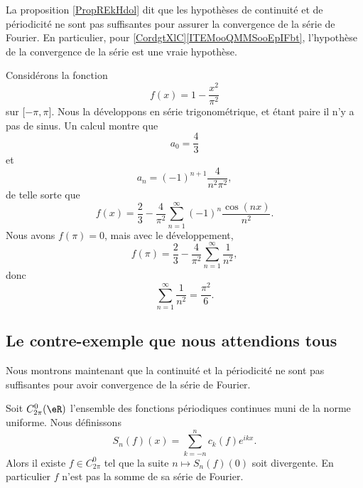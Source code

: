 \begin{normaltext}
	La proposition \ref{PropREkHdol} dit que les hypothèses de continuité et de périodicité ne sont pas suffisantes pour assurer la convergence de la série de Fourier. En particulier, pour \ref{CordgtXlC}\ref{ITEMooQMMSooEpIFbt}, l'hypothèse de la convergence de la série est une vraie hypothèse.
\end{normaltext}

\begin{example}
	Considérons la fonction
	\begin{equation}
		f(x)=1-\frac{ x^2 }{ \pi^2 }
	\end{equation}
	sur \( \mathopen[ -\pi , \pi \mathclose]\). Nous la développons en série trigonométrique, et étant paire il n'y a pas de sinus. Un calcul montre que
	\begin{equation}
		a_0=\frac{ 4 }{ 3 }
	\end{equation}
	et
	\begin{equation}
		a_n=(-1)^{n+1}\frac{ 4 }{ n^2\pi^2 },
	\end{equation}
	de telle sorte que
	\begin{equation}
		f(x)=\frac{ 2 }{ 3 }-\frac{ 4 }{ \pi^2 }\sum_{n=1}^{\infty}(-1)^n\frac{ \cos(nx) }{ n^2 }.
	\end{equation}
	Nous avons \( f(\pi)=0\), mais avec le développement,
	\begin{equation}
		f(\pi)=\frac{ 2 }{ 3 }-\frac{ 4 }{ \pi^2 }\sum_{n=1}^{\infty}\frac{1}{ n^2 },
	\end{equation}
	donc
	\begin{equation}
		\sum_{n=1}^{\infty}\frac{1}{ n^2 }=\frac{ \pi^2 }{ 6 }.
	\end{equation}
\end{example}

\subsection{Le contre-exemple que nous attendions tous}

Nous montrons maintenant que la continuité et la périodicité ne sont pas suffisantes pour avoir convergence de la série de Fourier.

\begin{proposition} \label{PropREkHdol}
	Soit \( C^0_{2\pi}(\eR)\) l'ensemble des fonctions périodiques continues muni de la norme uniforme. Nous définissons
	\begin{equation}
		S_n(f)(x)=\sum_{k=-n}^nc_k(f) e^{ikx}.
	\end{equation}
	Alors il existe \( f\in C^0_{2\pi}\) tel que la suite \(n\mapsto S_n(f)(0)\) soit divergente. En particulier \( f\) n'est pas la somme de sa série de Fourier.
\end{proposition}

